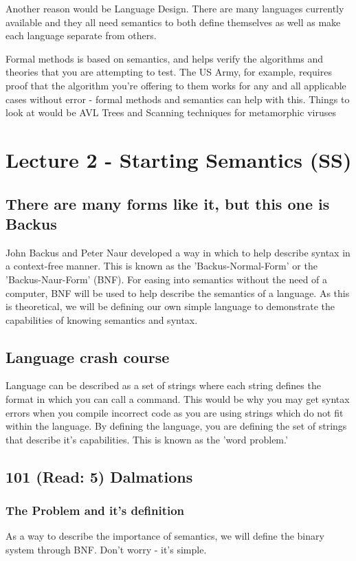 \documentclass[12pt]{article}
\begin{document}
Another reason would be Language Design.  There are many languages currently
available and they all need semantics to both define themselves as well as
make each language separate from others.

Formal methods is based on semantics, and helps verify the algorithms and
theories that you are attempting to test.  The US Army, for example, requires
proof that the algorithm you're offering to them works for any and all
applicable cases without error - formal methods and semantics can help with
this.  Things to look at would be AVL Trees and Scanning techniques for
metamorphic viruses

\section{Lecture 2 - Starting Semantics (SS)}
\label{sec-2}
\subsection{There are many forms like it, but this one is Backus}
\label{sec-2-1}
John Backus and Peter Naur developed a way in which to help describe syntax in
a context-free manner.  This is known as the 'Backus-Normal-Form' or the
'Backus-Naur-Form' (BNF)\cite{wikiBNF}.  For easing into semantics without the
need of a computer, BNF will be used to help describe the semantics of a
language.  As this is theoretical, we will be defining our own simple language
to demonstrate the capabilities of knowing semantics and syntax.

\subsection{Language crash course}
\label{sec-2-2}
Language can be described as a set of strings where each string defines the
format in which you can call a command.  This would be why you may get syntax
errors when you compile incorrect code as you are using strings which do not
fit within the language.  By defining the language, you are defining the set
of strings that describe it's capabilities.  This is known as the 'word
problem.'

\subsection{101 (Read: 5) Dalmations}
\label{sec-2-3}
\subsubsection{The Problem and it's definition}
\label{sec-2-3-1}
As a way to describe the importance of semantics, we will define the binary
system through BNF.  Don't worry - it's simple.
\end{document}
